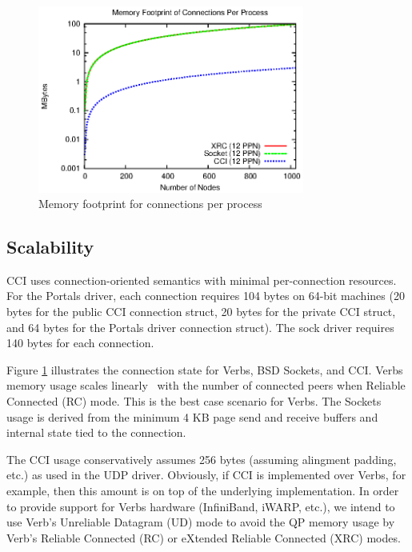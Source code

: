 \begin{figure}[htbp]
\centering
\includegraphics[width=3.45in]{memory_log.eps}
\caption{Memory footprint for connections per process}
\label{fig:memory}
\end{figure}

\subsection{Scalability}
CCI uses connection-oriented semantics with minimal per-connection resources.
For the Portals driver, each connection requires 104 bytes on 64-bit machines
(20 bytes for the public CCI connection struct, 20 bytes for the private CCI
struct, and 64 bytes for the Portals driver connection struct).  The sock driver
requires 140 bytes for each connection.

Figure \ref{fig:memory} illustrates the connection state for
Verbs, BSD Sockets, and CCI. Verbs memory usage scales
linearly~\cite{Shipman:2008:XIS:1431669.1431683} with the number of
connected peers when Reliable Connected (RC) mode. This is
the best case scenario for Verbs. The Sockets usage is derived from
the minimum 4 KB page send and receive buffers and internal state tied
to the connection. 


The CCI usage conservatively assumes 256 bytes (assuming alingment padding,
etc.) as used in the UDP driver. Obviously, if CCI is implemented over Verbs,
for example, then this amount is on top of the underlying implementation. In
order to provide support for Verbs hardware (InfiniBand, iWARP, etc.), we intend
to use Verb's Unreliable Datagram (UD) mode to avoid the QP memory usage by
Verb's Reliable Connected (RC) or eXtended Reliable Connected (XRC) modes.

